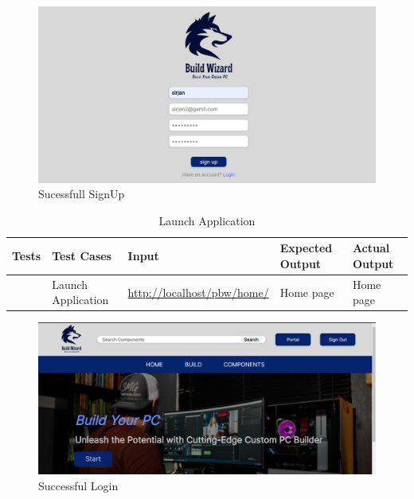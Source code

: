     \begin{figure}[H]
    \includegraphics[width=15cm]{Diagrams/sucesssignup.png}
    \caption{Sucessfull SignUp}
    \end{figure}
    \begin{table}[H]
        \caption{Launch Application}
            \label{}
            \begin{tabularx}{\textwidth}{|>{\raggedright\arraybackslash}p{0.3in}|X|>{\raggedright\arraybackslash}p{2in}|X|X|}
                \hline
                Tests & Test Cases & Input & Expected Output & Actual Output \\
                \hline
                    1 & Launch Application & \url{http://localhost/pbw/home/}& Home page & Home page \\
                    \hline
    \end{tabularx}
    \end{table}
    \begin{figure}[H]
    \includegraphics[width=15cm]{Diagrams/sucessloginpage.png}
    \caption{Successful Login}
    \end{figure}
    \newpage
